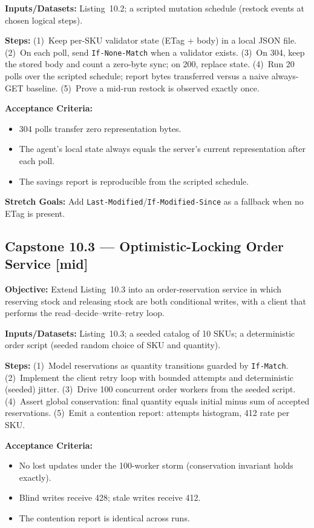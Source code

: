 \textbf{Inputs/Datasets:} Listing~10.2; a scripted mutation schedule (restock
events at chosen logical steps).

\textbf{Steps:} (1)~Keep per-SKU validator state (ETag + body) in a local
JSON file. (2)~On each poll, send \texttt{If-None-Match} when a validator
exists. (3)~On 304, keep the stored body and count a zero-byte sync; on 200,
replace state. (4)~Run 20 polls over the scripted schedule; report bytes
transferred versus a naive always-GET baseline. (5)~Prove a mid-run restock
is observed exactly once.

\textbf{Acceptance Criteria:}
\begin{itemize}
  \item[$\square$] 304 polls transfer zero representation bytes.
  \item[$\square$] The agent's local state always equals the server's
        current representation after each poll.
  \item[$\square$] The savings report is reproducible from the scripted
        schedule.
\end{itemize}

\textbf{Stretch Goals:} Add \texttt{Last-Modified}/\texttt{If-Modified-Since}
as a fallback when no ETag is present.

\subsection*{Capstone 10.3 --- Optimistic-Locking Order Service \hfill [mid]}
\textbf{Objective:} Extend Listing~10.3 into an order-reservation service in
which reserving stock and releasing stock are both conditional writes, with
a client that performs the read--decide--write--retry loop.

\textbf{Inputs/Datasets:} Listing~10.3; a seeded catalog of 10 SKUs; a
deterministic order script (seeded random choice of SKU and quantity).

\textbf{Steps:} (1)~Model reservations as quantity transitions guarded by
\texttt{If-Match}. (2)~Implement the client retry loop with bounded
attempts and deterministic (seeded) jitter. (3)~Drive 100 concurrent order
workers from the seeded script. (4)~Assert global conservation: final
quantity equals initial minus sum of accepted reservations. (5)~Emit a
contention report: attempts histogram, 412 rate per SKU.

\textbf{Acceptance Criteria:}
\begin{itemize}
  \item[$\square$] No lost updates under the 100-worker storm
        (conservation invariant holds exactly).
  \item[$\square$] Blind writes receive 428; stale writes receive 412.
  \item[$\square$] The contention report is identical across runs.
\end{itemize}

